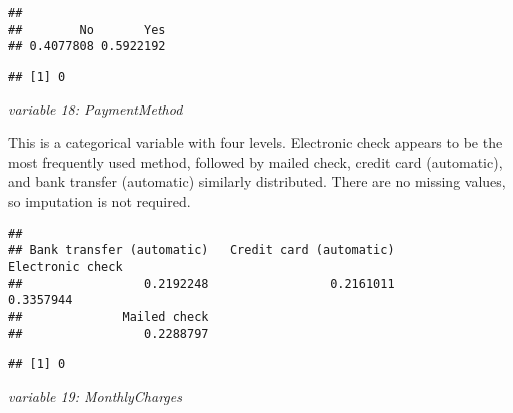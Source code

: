 \documentclass[
  a4paper]{article}
\newenvironment{Shaded}{\begin{snugshade}}{\end{snugshade}}
\newcommand{\CommentTok}[1]{\textcolor[rgb]{0.56,0.35,0.01}{\textit{#1}}}
\newcommand{\FunctionTok}[1]{\textcolor[rgb]{0.13,0.29,0.53}{\textbf{#1}}}
\newcommand{\NormalTok}[1]{#1}
\newcommand{\SpecialCharTok}[1]{\textcolor[rgb]{0.81,0.36,0.00}{\textbf{#1}}}
\begin{document}
\begin{verbatim}
## 
##        No       Yes 
## 0.4077808 0.5922192
\end{verbatim}

\begin{Shaded}
\end{Shaded}

\begin{verbatim}
## [1] 0
\end{verbatim}

\emph{variable 18: PaymentMethod}

This is a categorical variable with four levels. Electronic check
appears to be the most frequently used method, followed by mailed check,
credit card (automatic), and bank transfer (automatic) similarly
distributed. There are no missing values, so imputation is not required.

\begin{Shaded}
\end{Shaded}

\begin{verbatim}
## 
## Bank transfer (automatic)   Credit card (automatic)          Electronic check 
##                 0.2192248                 0.2161011                 0.3357944 
##              Mailed check 
##                 0.2288797
\end{verbatim}

\begin{Shaded}
\end{Shaded}

\begin{verbatim}
## [1] 0
\end{verbatim}

\emph{variable 19: MonthlyCharges}
\end{document}
